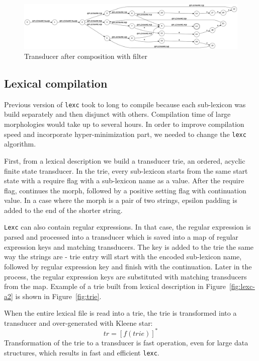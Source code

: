 \documentclass[11pt]{article}
\begin{document}
\begin{figure}
    \includegraphics[width=\textwidth]{after_comp.png}
     \caption{Transducer after composition with filter
     \label{fig:after}}
\end{figure}



\subsection{Lexical compilation}

Previous version of \texttt{lexc} took to long to compile because each sub-lexicon was build separately and then disjunct with others. Compilation time of large morphologies would take up to several hours. In order to improve compilation speed and incorporate hyper-minimization part, we needed to change the \texttt{lexc} algorithm.

First, from a lexical description we build a transducer trie, an ordered, acyclic finite state transducer. In the trie, every sub-lexicon 
starts from the same start state with a require flag with a sub-lexicon name as a value. After the require flag, continues the morph, followed 
by a positive setting flag with continuation value. In a case where the morph is a pair of two strings, epsilon padding is added to the end of 
the shorter string.

\texttt{Lexc} can also contain regular expressions. In that case, the regular expression is parsed and processed into a transducer which is saved into 
a map of regular expression keys and matching transducers. The key is added to the trie the same way the strings are - trie entry will start with 
the encoded sub-lexicon name, followed by regular expression key and finish with the continuation. Later in the process, the regular expression 
keys are substituted with matching transducers from the map. 
Example of a trie built from lexical description in Figure~\ref{fig:lexc-a2} is shown in Figure~\ref{fig:trie}.

When the entire lexical file is read into a trie, the trie is transformed into a transducer and over-generated with Kleene star:
\begin{equation}\label{eq:trie_star}
tr = \left[f(trie)\right]^* 
\end{equation}
Transformation of the trie to a transducer is fast operation, even for large data structures, which results in fast and efficient \texttt{lexc}.
\end{document}
